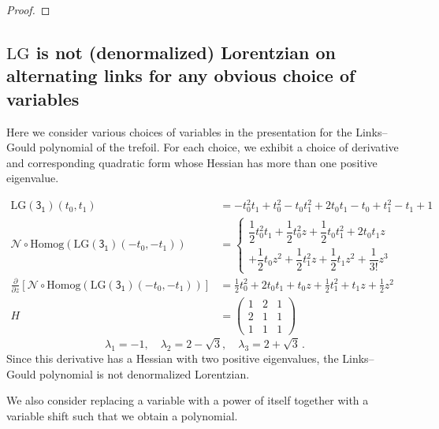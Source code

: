 \documentclass[12pt,reqno]{amsart}
\theoremstyle{definition}
\def\LG{\mathrm{LG}}
\def\homog{\mathrm{Homog}}
\def\normal{\mathcal{N}}
\begin{document}
\begin{proof}
\end{proof}


\subsection{\texorpdfstring{$\LG$}{LG} is not (denormalized) Lorentzian on alternating links for any obvious choice of variables}
\label{subs.noLG}

Here we consider various choices of variables in the presentation for the Links--Gould polynomial of the trefoil. For each choice, we exhibit a choice of derivative and corresponding quadratic form whose Hessian has more than one positive eigenvalue.

\begin{align*}
    \LG(\mathsf{3_1})(t_0, t_1) &= -t_0^2t_1 + t_0^2 - t_0t_1^2 + 2t_0t_1 - t_0 + t_1^2 - t_1 + 1
\\
\normal\circ\homog(\LG(\mathsf{3_1})(-t_0, -t_1))
&=
\left\lbrace 
\begin{matrix}
    \dfrac{1}{2}t_0^2t_1 + \dfrac{1}{2}t_0^2z + \dfrac{1}{2}t_0t_1^2 + 2t_0t_1z \\[2ex]+ \dfrac{1}{2}t_0z^2 + \dfrac{1}{2}t_1^2z + \dfrac{1}{2}t_1z^2 + \dfrac{1}{3!}z^3
\end{matrix}
\right.
\\
\frac{\partial}{\partial z}[\normal\circ\homog(\LG(\mathsf{3_1})(-t_0, -t_1))]
&=
\frac{1}{2}t_0^2 + 2t_0t_1 + t_0z + \frac{1}{2}t_1^2 + t_1z + \frac{1}{2}z^2
\\
H &= \begin{pmatrix} 1&2&1\\2&1&1\\1&1&1
\end{pmatrix}
\end{align*}
\[\lambda_1= -1,\quad \lambda_2= 2-\sqrt{3},\quad \lambda_3= 2+\sqrt{3}\,.\]
Since this derivative has a Hessian with two positive eigenvalues, the Links--Gould polynomial is not denormalized Lorentzian.

We also consider replacing a variable with a power of itself together with a variable shift such that we obtain a polynomial. 
\end{document}
